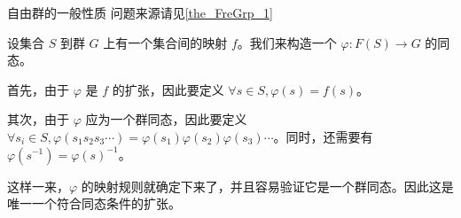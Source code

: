 \begin{example}{自由群的一般性质}\label{ex_GroupP_4}
问题来源请见\autoref{the_FreGrp_1}~

设集合 $S$ 到群 $G$ 上有一个集合间的映射 $f$。我们来构造一个 $\varphi: F(S)\rightarrow G$ 的同态。

首先，由于 $\varphi$ 是 $f$ 的扩张，因此要定义 $\forall s\in S, \varphi(s)=f(s)$。

其次，由于 $\varphi$ 应为一个群同态，因此要定义 $\forall s_i\in S, \varphi({s_1s_2s_3\cdots})=\varphi(s_1)\varphi(s_2)\varphi(s_3)\cdots$。同时，还需要有 $\varphi(s^{-1})=\varphi(s)^{-1}$。

这样一来，$\varphi$ 的映射规则就确定下来了，并且容易验证它是一个群同态。因此这是唯一一个符合同态条件的扩张。


\end{example}

